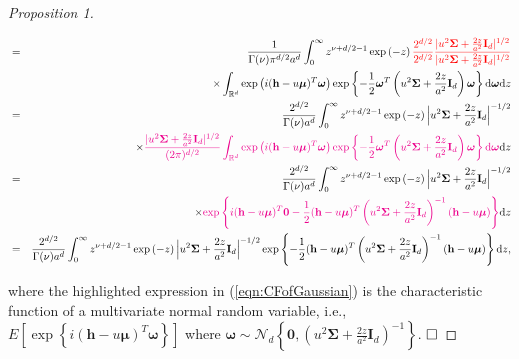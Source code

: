 \documentclass[12pt]{article}
\newcommand{\0}{\mathbf{0}}
\newtheorem{proof}{Proof}
\begin{document}
\begin{proof}[Proposition 1]
\begin{small}
\begin{eqnarray}
&=&\frac{1}{ \Gamma(\nu)\pi^{d/2}a^{d}}\int_0^{\infty}z^{\nu+d/2-1} \exp\left(-z\right) \textcolor{red}{\frac{2^{d/2}}{2^{d/2}}\frac{|u^2\boldsymbol{\Sigma}+\frac{2z}{a^2}\mathbf{I}_{d}|^{1/2}}{|u^2\boldsymbol{\Sigma}+\frac{2z}{a^2}\mathbf{I}_{d}|^{1/2}}} \nonumber \\
&&\times \int_{\mathbb{R}^d}  \exp \left(i(\mathbf{h}-u\boldsymbol{\mu})^T\boldsymbol{\omega}\right) \exp\left\{-\frac{1}{2}\boldsymbol{\omega}^T\left(u^2\boldsymbol{\Sigma}+\frac{2z}{a^2}\mathbf{I}_{d}\right)\boldsymbol{\omega}\right\} \dd \boldsymbol{\omega} \dd z\nonumber \\
&=&\frac{2^{d/2}}{ \Gamma(\nu)a^{d}}\int_0^{\infty}z^{\nu+d/2-1} \exp\left(-z\right)\Big|u^2\boldsymbol{\Sigma}+\frac{2z}{a^2}\mathbf{I}_{d}\Big|^{-1/2}\nonumber \\
&&\times \textcolor{magenta}{\frac{|u^2\boldsymbol{\Sigma}+\frac{2z}{a^2}\mathbf{I}_{d}|^{1/2}}{(2\pi)^{d/2}}\int_{\mathbb{R}^d}  \exp \left(i(\mathbf{h}-u\boldsymbol{\mu})^T\boldsymbol{\omega}\right) \exp\left\{-\frac{1}{2}\boldsymbol{\omega}^T\left(u^2\boldsymbol{\Sigma}+\frac{2z}{a^2}\mathbf{I}_{d}\right)\boldsymbol{\omega}\right\} \dd \boldsymbol{\omega}} \dd z \label{eqn:CFofGaussian}  \\
&=&\frac{2^{d/2}}{ \Gamma(\nu)a^{d}} \int_0^{\infty}z^{\nu+d/2-1} \exp\left(-z\right)\Big|u^2\boldsymbol{\Sigma}+\frac{2z}{a^2}\mathbf{I}_{d}\Big|^{-1/2} \nonumber \\
&&\times\textcolor{magenta}{ \exp\left\{i(\mathbf{h}-u\boldsymbol{\mu})^T\mathbf{0}-\frac{1}{2}(\mathbf{h}-u\boldsymbol{\mu})^T\left(u^2\boldsymbol{\Sigma}+\frac{2z}{a^2}\mathbf{I}_{d}\right)^{-1}(\mathbf{h}-u\boldsymbol{\mu})\right\}}\dd z   \nonumber \\
&=&\frac{2^{d/2}}{ \Gamma(\nu)a^{d}} \int_0^{\infty}z^{\nu+d/2-1} \exp\left(-z\right)\Big|u^2\boldsymbol{\Sigma}+\frac{2z}{a^2}\mathbf{I}_{d}\Big|^{-1/2}\exp\left\{-\frac{1}{2}(\mathbf{h}-u\boldsymbol{\mu})^T\left(u^2\boldsymbol{\Sigma}+\frac{2z}{a^2}\mathbf{I}_{d}\right)^{-1}(\mathbf{h}-u\boldsymbol{\mu})\right\}\dd z, \nonumber\\ \label{eqn:CFofGaussian2}
\end{eqnarray}
\end{small}
where the highlighted expression in (\ref{eqn:CFofGaussian}) is the characteristic function of a multivariate normal random variable, i.e., $E\left[\exp\left\{i(\mathbf{h}-u\boldsymbol{\mu})^T\boldsymbol{\omega}\right\}\right]$ where $\boldsymbol{\omega}\sim \mathcal{N}_d\left\{\mathbf{0}, \left(u^2\boldsymbol{\Sigma}+\frac{2z}{a^2}\mathbf{I}_{d}\right)^{-1}\right\}$.
$\hfill \Box$


\end{proof}
\end{document}
